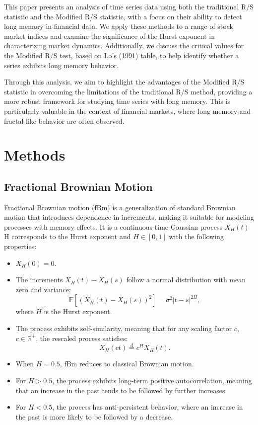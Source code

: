 \documentclass[11pt]{extarticle}
\begin{document}
This paper presents an analysis of time series data using both the traditional R/S statistic and the Modified R/S statistic, with a focus on their ability to detect long memory in financial data. We apply these methods to a range of stock market indices and examine the significance of the Hurst exponent in characterizing market dynamics. Additionally, we discuss the critical values for the Modified R/S test, based on Lo’s (1991) table, to help identify whether a series exhibits long memory behavior.

Through this analysis, we aim to highlight the advantages of the Modified R/S statistic in overcoming the limitations of the traditional R/S method, providing a more robust framework for studying time series with long memory. This is particularly valuable in the context of financial markets, where long memory and fractal-like behavior are often observed.



\section{Methods}

\subsection{Fractional Brownian Motion}

Fractional Brownian motion (fBm) is a generalization of standard Brownian motion that introduces dependence in increments,
making it suitable for modeling processes with memory effects. It is a continuous-time Gaussian process \( X_H(t) \) H corresponds
to the Hurst exponent and \( H \in [0, 1] \) with the following properties:

\begin{itemize}
    \item \( X_H(0) = 0 \).
    \item The increments \( X_H(t) - X_H(s) \) follow a normal distribution with mean zero and variance:
    \begin{equation}
        \mathbb{E} \left[ (X_H(t) - X_H(s))^2 \right] = \sigma^2|t - s|^{2H},
    \end{equation}
    where \( H \) is the Hurst exponent.
    \item The process exhibits self-similarity, meaning that for any scaling factor \( c \), \( c \in \mathbb{R}^+ \), the rescaled process satisfies:
    \begin{equation}
        X_H(ct) \overset{d}{=} c^H X_H(t).
    \end{equation}
    \item When \( H = 0.5 \), fBm reduces to classical Brownian motion.
    \item For \( H > 0.5 \), the process exhibits long-term positive autocorrelation, meaning that an increase in the past tends to be followed by further increases.
    \item For \( H < 0.5 \), the process has anti-persistent behavior, where an increase in the past is more likely to be followed by a decrease.
\end{itemize}
\end{document}
